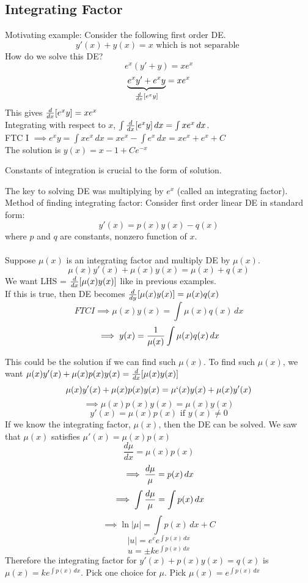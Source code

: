 \documentclass[english, 12pt]{article}
\begin{document}
\subsection{Integrating Factor}
Motivating example: Consider the following first order DE.
\[y'(x) + y(x) = x \text{ which is not separable } \]
How do we solve this DE?
\[e^x(y' + y) = x e^x \]
\[\underbrace{e^x y' + e^x y}_{\frac{d}{dx} [e^x y]} = x e^x \]
This gives $\frac{d}{dx} [e^x y] = xe^x$\\
Integrating with respect to $x$, $\int \frac{d}{dx}[e^x y]\,dx = \int x e^x \,dx$.\\
FTC I $\implies e^x y = \int x e^x \, dx = x e^x - \int e^x \,dx = x e^x + e^x + C$\\
The solution is $y(x) = x-1 + C e^{-x}$
\begin{note}
Constants of integration is crucial to the form of solution.
\end{note}
The key to solving DE was multiplying by $e^x$ (called an integrating factor). Method of finding integrating factor: Consider first order linear DE in standard form:
\[ y'(x) = p(x) y(x) - q(x) \]
where $p$ and $q$ are constants, nonzero function of $x$.\\\\

Suppose $\mu(x)$ is an integrating factor and multiply DE by $\mu (x)$. 
\[\mu(x) y'(x) + \mu(x) y(x) = \mu(x) + q(x) \]
We want LHS = $\frac{d}{dx}[\mu(x) y(x)]$ like in previous examples.\\
If this is true, then DE becomes $\frac{d}{dy} [ \mu(x) y(x)]= \mu(x) q(x)$\\
\[FTC I \implies \mu(x) y(x) = \int \mu(x) q(x)\,dx \]
\[ \implies y(x) = \frac{1}{\mu(x)} \int \mu(x) q(x)\,dx \]

This could be the solution if we can find such $\mu (x)$. To find such $\mu(x)$, we want $\mu(x) y'(x) + \mu(x) p(x) y(x) = \frac{d}{dx} [ \mu(x)y(x) ]$
\[\mu(x) y'(x) + \mu(x) p(x) y(x) = \mu `(x) y(x) + \mu(x) y'(x)\]
\[ \implies \mu(x) p(x) y(x) = \mu(x) y(x) \]
\[ y'(x) = \mu (x) p(x) \text{ if } y(x) \neq 0 \]
If we know the integrating factor, $\mu (x)$, then the DE can be solved. We saw that $\mu (x)$ satisfies $\mu '(x) = \mu (x)p(x)$
\[\frac{d\mu}{dx} = \mu(x)p(x) \]
\[ \implies \frac{d\mu}{\mu} = p(x)\,dx \]
\[ \implies \int \frac{d\mu}{\mu} = \int p(x)\,dx \]
\[ \implies \ln |\mu| = \int p(x)\,dx + C \]
\[|u| = e^c e^{\int p(x)\,dx} \]
\[u = \pm k e^{\int p(x)\,dx} \]
Therefore the integrating factor for $y'(x) + p(x) y(x) = q(x)$ is $\mu (x) = k e^{\int p(x)\,dx}$. Pick one choice for $\mu$. Pick $\mu (x) = e^{\int p(x)\,dx}$
\end{document}
